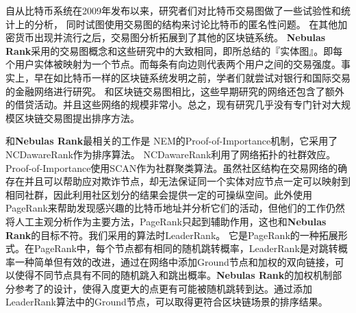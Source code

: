 自从比特币\cite{Nakamoto2008}系统在2009年发布以来，研究者们对比特币交易图做了一些试验性和统计上的分析\cite{Ron}\cite{Haslhofer}\cite{NielKondor2014}\cite{Baumann2014}， 同时试图使用交易图的结构来讨论比特币的匿名性问题\cite{Meiklejohn2013}\cite{Ober2013}\cite{pham2016anomaly}\cite{Fleder2015}\cite{Ferrin2015}。 在其他加密货币出现并流行之后，交易图分析拓展到了其他的区块链系统\cite{Chang2017}\cite{Anderson2016}。 \textbf{Nebulas Rank}采用的交易图概念和这些研究中的大致相同，即\textcite{Tschorsch2015}所总结的『实体图』。即每个用户实体被映射为一个节点。而每条有向边则代表两个用户之间的交易强度。事实上，早在如比特币一样的区块链系统发明之前，学者们就尝试对银行和国际交易的金融网络进行研究\cite{propper2008towards}\cite{Boss2004}\cite{Serrano2007}\cite{Bech2008}\cite{Fagiolo2009}\cite{Morten2006}\cite{Boss2004a}\cite{Krempel2002}\cite{Serrano2003}。 和区块链交易图相比，这些早期研究的网络还包含了额外的借贷活动。并且这些网络的规模非常小。总之，现有研究几乎没有专门针对大规模区块链交易图提出排序方法。

和\textbf{Nebulas Rank}最相关的工作是 NEM\cite{nem}的Proof-of-Importance机制，它采用了 NCDawareRank\cite{Nikolakopoulos2013}作为排序算法。 NCDawareRank\cite{Nikolakopoulos2013}利用了网络拓扑的社群效应。Proof-of-Importance使用SCAN\cite{xu2007scan}\cite{shiokawa2015scan}\cite{chang2017mathsf}作为社群聚类算法。虽然社区结构在交易网络的确存在并且可以帮助应对欺诈节点，却无法保证同一个实体对应节点一定可以映射到相同社群，因此利用社区划分的结果会提供一定的可操纵空间。此外\textcite{Fleder2015}使用PageRank来帮助发现感兴趣的比特币地址并分析它们的活动，但他们的工作仍然将人工主观分析作为主要方法，PageRank只起到辅助作用，这也和\textbf{Nebulas Rank}的目标不符。我们采用的算法时LeaderRank\cite{Chen2013}\cite{Li2014}。 它是PageRank的一种拓展形式。在PageRank中，每个节点都有相同的随机跳转概率，LeaderRank是对跳转概率一种简单但有效的改进，通过在网络中添加Ground节点和加权的双向链接，可以使得不同节点具有不同的随机跳入和跳出概率。\textbf{Nebulas Rank}的加权机制部分参考了\textcite{Li2014}的设计，使得入度更大的点更有可能被随机跳转到达。通过添加LeaderRank算法中的Ground节点，可以取得更符合区块链场景的排序结果。

